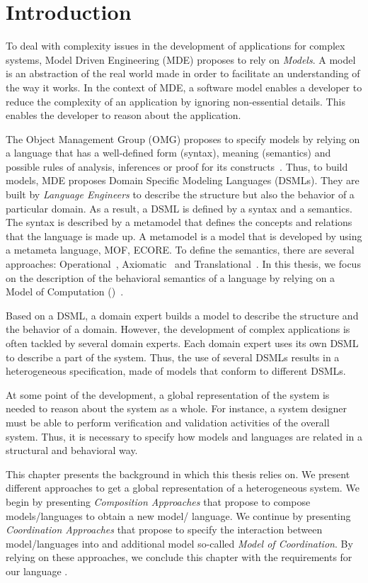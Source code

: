 \section{Introduction}
To deal with complexity issues in the development of applications for complex systems, Model Driven Engineering (MDE) proposes to rely on \emph{Models}. A model is an abstraction of the real world made in order to facilitate an understanding of the way it works. In the context of MDE, a software model enables a developer to reduce the complexity of an application by ignoring non-essential details. This enables the developer to reason about the application. 

The Object Management Group (OMG) proposes to specify models by relying on a language that has a well-defined form (syntax), meaning (semantics) and possible rules of analysis, inferences or proof for its constructs~\cite{mdaguide}. Thus, to build models, MDE proposes Domain Specific Modeling Languages (DSMLs). They are built by \emph{Language Engineers} to describe the structure but also the behavior of a particular domain. As a result, a DSML is defined by a syntax and a semantics. The syntax is described by a metamodel that defines the concepts and relations that the language is made up. A metamodel is a model that is developed by using a metameta language, \eg MOF, ECORE. To define the semantics, there are several approaches: Operational~\cite{operationbib}, Axiomatic~\cite{axiomaticbib} and Translational~\cite{translationalbib}. In this thesis, we focus on the description of the behavioral semantics of a language by relying on a Model of Computation (\mocc)~\cite{moccsemanticbib}. 

Based on a DSML, a domain expert builds a model to describe the structure and the behavior of a domain. However, the development of complex applications is often tackled by several domain experts. Each domain expert uses its own DSML to describe a part of the system. Thus, the use of several DSMLs results in a heterogeneous specification, \ie made of models that conform to different DSMLs. 

At some point of the development, a global representation of the system is needed to reason about the system as a whole. For instance, a system designer must be able to perform verification and validation activities of the overall system. Thus, it is necessary to specify how models and languages are related in a structural and behavioral way. 

This chapter presents the background in which this thesis relies on. We present different approaches to get a global representation of a heterogeneous system. We begin by presenting \emph{Composition Approaches} that propose to compose models/languages to obtain a new model/ language. We continue by presenting \emph{Coordination Approaches} that propose to specify the interaction between model/languages into and additional model so-called \emph{Model of Coordination}. By relying on these approaches, we conclude this chapter with the requirements for our language \bcool.  


